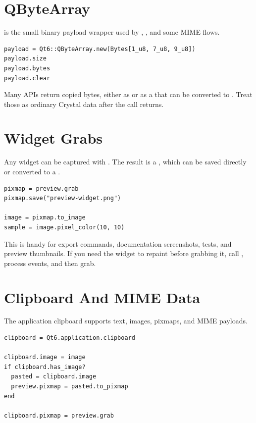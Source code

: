 \section{QByteArray}

 is the small binary payload wrapper used by , , and some MIME flows.

\begin{lstlisting}[style=crystal]
payload = Qt6::QByteArray.new(Bytes[1_u8, 7_u8, 9_u8])
payload.size
payload.bytes
payload.clear
\end{lstlisting}

Many APIs return copied bytes, either as  or as a  that can be converted to . Treat those as ordinary Crystal data after the call returns.

\section{Widget Grabs}

Any widget can be captured with . The result is a , which can be saved directly or converted to a .

\begin{lstlisting}[style=crystal]
pixmap = preview.grab
pixmap.save("preview-widget.png")

image = pixmap.to_image
sample = image.pixel_color(10, 10)
\end{lstlisting}

This is handy for export commands, documentation screenshots, tests, and preview thumbnails. If you need the widget to repaint before grabbing it, call , process events, and then grab.

\section{Clipboard And MIME Data}

The application clipboard supports text, images, pixmaps, and MIME payloads.

\begin{lstlisting}[style=crystal]
clipboard = Qt6.application.clipboard

clipboard.image = image
if clipboard.has_image?
  pasted = clipboard.image
  preview.pixmap = pasted.to_pixmap
end

clipboard.pixmap = preview.grab
\end{lstlisting}

